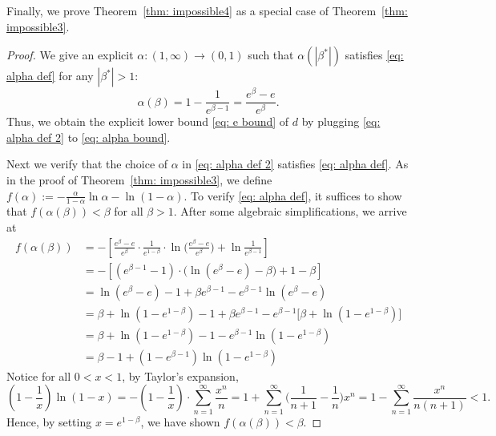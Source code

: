 \documentclass[11pt]{article}
\theoremstyle{definition}
\theoremstyle{remark}
\begin{document}
Finally, we prove Theorem~\ref{thm: impossible4} as a special case of Theorem~\ref{thm: impossible3}.
\begin{proof}
     We give an explicit $\alpha:(1,\infty) \rightarrow (0,1)$ such that $\alpha(|\beta^*|)$  satisfies \eqref{eq: alpha def} for any $|\beta^*|>1$:
    \begin{equation}
        \label{eq: alpha def 2}
        \alpha(\beta) = 1 - \frac{1}{e^{\beta-1} } = \frac{e^\beta - e}{e^\beta}.
    \end{equation}
    Thus, we obtain the explicit lower bound \eqref{eq: e bound} of $d$ 
    by plugging \eqref{eq: alpha def 2} to \eqref{eq: alpha bound}.

    Next we verify that the choice of $\alpha$ in \eqref{eq: alpha def 2} satisfies \eqref{eq: alpha def}.
    As in the proof of Theorem~\ref{thm: impossible3}, 
    we define 
    $ f(\alpha):=-\frac{\alpha}{1-\alpha} \ln{\alpha} - \ln{(1-\alpha)}$.
    To verify \eqref{eq: alpha def}, it suffices to show that $f(\alpha (\beta )) < \beta$ for all $\beta >1$.
    After some algebraic simplifications, we arrive at 
    \begin{align*}
        f(\alpha(\beta)) &= -\left[ 
           \frac{e^\beta - e}{e^\beta} \cdot \frac{1}{e^{1-\beta} }\cdot \ln\big( \frac{e^\beta - e}{e^\beta} \big)
           + \ln\frac{1}{e^{\beta-1}} 
        \right] \\
        &= -\left[ 
            (e^{\beta - 1} - 1) \cdot
            \big( \ln( e^\beta - e ) - \beta\big)
            + 1 -\beta
        \right]\\
        &= \ln( e^\beta - e ) -1 + \beta e^{\beta -1} -e^{\beta -1}\ln( e^\beta - e )\\
        &= \beta + \ln(1-e^{1-\beta})-1 + \beta e^{\beta -1} - e^{\beta -1 }\big[ \beta + \ln(1-e^{1-\beta}) \big] \\
        &= \beta +   \ln(1-e^{1-\beta}) -1 - e^{\beta -1 } \ln(1-e^{1-\beta}) \\
        &= \beta - 1+ (1 - e^{\beta -1}) \ln(1-e^{1-\beta})
    \end{align*}
    Notice for all $0<x<1$, by Taylor's expansion, 
    \[
        (1-\frac{1}{x}) \ln(1-x) = -(1-\frac{1}{x})\cdot \sum_{n=1}^\infty \frac{x^n}{n} = 1 + \sum_{n=1}^\infty \big( \frac{1}{n+1} - \frac{1}{n} \big) x^n 
        = 1 - \sum_{n=1}^\infty  \frac{x^n}{n(n+1)}<1.
    \]
    Hence, by setting $x=e^{1-\beta}$, we have shown $f(\alpha(\beta))<\beta$.
\end{proof}

  
  
 
\end{document}

